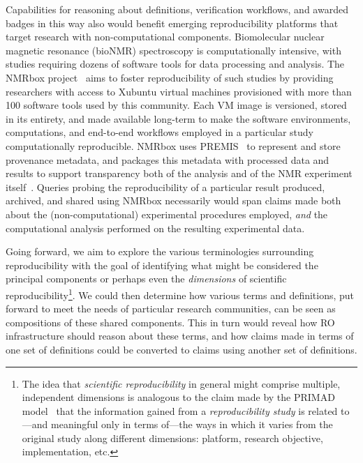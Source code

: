 Capabilities for reasoning about definitions, verification workflows, and awarded
    badges in this way also would benefit emerging reproducibility platforms that
    target research with non-computational components.
Biomolecular nuclear magnetic resonance (bioNMR) spectroscopy is
    computationally intensive, with studies requiring dozens of software tools for data
    processing and analysis.
The \mbox{NMRbox} project~\cite{maciejewski_nmrbox:_2017} aims to foster reproducibility of such studies
    by providing researchers with access to
    Xubuntu virtual machines provisioned with more than 100 software tools used by this community.
Each VM image is versioned, stored in its entirety, and made
    available long-term to make the software environments, computations, and end-to-end workflows
    employed in a particular study computationally reproducible.
NMRbox uses PREMIS~\cite{premis2019} to represent and store provenance metadata,
    and packages this metadata with
    processed data and results to support transparency both of the analysis and of the NMR
    experiment itself~\cite{heintz_curating_2019}.
Queries probing the reproducibility of a particular result produced, archived, and shared
    using NMRbox necessarily would span claims made both about the (non-computational)
    experimental procedures employed, \emph{and} the computational analysis performed on
    the resulting experimental data.

Going forward, we aim to explore the various terminologies surrounding
    reproducibility with the goal of identifying what might be considered the
     principal components or perhaps even the \emph{dimensions} of scientific reproducibility\footnote{
        The idea that \emph{scientific reproducibility} in general might comprise multiple,
            independent dimensions
            is analogous to the claim made by the PRIMAD
            model~\cite{rauber16primad} that the information gained
            from a \emph{reproducibility study} is related to---and meaningful only in terms
            of---the ways in which it varies from the original study along
            different dimensions: platform, research objective, implementation, etc.
    }.
We could then determine how various terms and definitions,
    put forward to meet the needs of particular research communities,
    can be seen as compositions of these shared components.
This in turn would reveal how RO infrastructure should reason about these terms,
	and how claims made in terms of one set of definitions could be converted to
    claims using another set of definitions.
